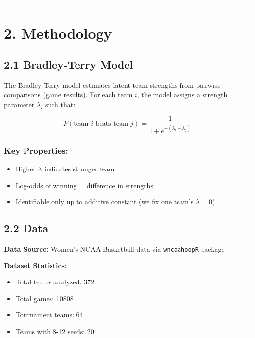 \documentclass[
]{article}
\providecommand{\tightlist}{%
  \setlength{\itemsep}{0pt}\setlength{\parskip}{0pt}}
\begin{document}
\begin{center}\rule{0.5\linewidth}{0.5pt}\end{center}

\section{2. Methodology}\label{methodology}

\subsection{2.1 Bradley-Terry Model}\label{bradley-terry-model}

The Bradley-Terry model estimates latent team strengths from pairwise
comparisons (game results). For each team \(i\), the model assigns a
strength parameter \(\lambda_i\) such that:

\[P(\text{team } i \text{ beats team } j) = \frac{1}{1 + e^{-(\lambda_i - \lambda_j)}}\]

\subsubsection{Key Properties:}\label{key-properties}

\begin{itemize}
\tightlist
\item
  Higher \(\lambda\) indicates stronger team
\item
  Log-odds of winning = difference in strengths
\item
  Identifiable only up to additive constant (we fix one team's
  \(\lambda = 0\))
\end{itemize}

\subsection{2.2 Data}\label{data}

\textbf{Data Source:} Women's NCAA Basketball data via
\texttt{wncaahoopR} package

\textbf{Dataset Statistics:}

\begin{itemize}
\tightlist
\item
  Total teams analyzed: 372
\item
  Total games: 10808
\item
  Tournament teams: 64
\item
  Teams with 8-12 seeds: 20
\end{itemize}
\end{document}
